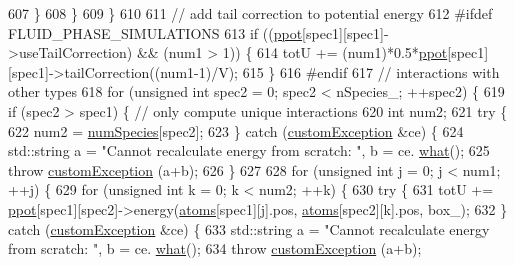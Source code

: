 \begin{DoxyCode}
607                 \}
608             \}
609         \}
610         
611         \textcolor{comment}{// add tail correction to potential energy}
612 \textcolor{preprocessor}{#ifdef FLUID\_PHASE\_SIMULATIONS}
613         \textcolor{keywordflow}{if} ((\hyperlink{classsim_system_a8d6271751a62f61edcf57f773540a4a3}{ppot}[spec1][spec1]->useTailCorrection) && (num1 > 1)) \{
614                 totU += (num1)*0.5*\hyperlink{classsim_system_a8d6271751a62f61edcf57f773540a4a3}{ppot}[spec1][spec1]->tailCorrection((num1-1)/V);
615         \}
616 \textcolor{preprocessor}{#endif        }
617         \textcolor{comment}{// interactions with other types}
618         \textcolor{keywordflow}{for} (\textcolor{keywordtype}{unsigned} \textcolor{keywordtype}{int} spec2 = 0; spec2 < nSpecies\_; ++spec2) \{
619             \textcolor{keywordflow}{if} (spec2 > spec1) \{ \textcolor{comment}{// only compute unique interactions}
620                 \textcolor{keywordtype}{int} num2;
621                 \textcolor{keywordflow}{try} \{
622                     num2 = \hyperlink{classsim_system_a9eea865e6dc1cff377b1e79c4d9c23f0}{numSpecies}[spec2];
623                 \} \textcolor{keywordflow}{catch} (\hyperlink{classcustom_exception}{customException} &ce) \{
624                     std::string a = \textcolor{stringliteral}{"Cannot recalculate energy from scratch: "}, b = ce.
      \hyperlink{classcustom_exception_aeb6ab5848b038adfc68fde86a512f691}{what}();
625                     \textcolor{keywordflow}{throw} \hyperlink{classcustom_exception}{customException} (a+b);
626                 \}
627                 
628                 \textcolor{keywordflow}{for} (\textcolor{keywordtype}{unsigned} \textcolor{keywordtype}{int} j = 0; j < num1; ++j) \{
629                     \textcolor{keywordflow}{for} (\textcolor{keywordtype}{unsigned} \textcolor{keywordtype}{int} k = 0; k < num2; ++k) \{
630                         \textcolor{keywordflow}{try} \{
631                             totU += \hyperlink{classsim_system_a8d6271751a62f61edcf57f773540a4a3}{ppot}[spec1][spec2]->energy(\hyperlink{classsim_system_a90421b19082f7fb8fc23b7264b1161e4}{atoms}[spec1][j].pos, 
      \hyperlink{classsim_system_a90421b19082f7fb8fc23b7264b1161e4}{atoms}[spec2][k].pos, box\_);
632                         \} \textcolor{keywordflow}{catch} (\hyperlink{classcustom_exception}{customException} &ce) \{
633                             std::string a = \textcolor{stringliteral}{"Cannot recalculate energy from scratch: "}, b = ce.
      \hyperlink{classcustom_exception_aeb6ab5848b038adfc68fde86a512f691}{what}();
634                             \textcolor{keywordflow}{throw} \hyperlink{classcustom_exception}{customException} (a+b);

\end{DoxyCode}
